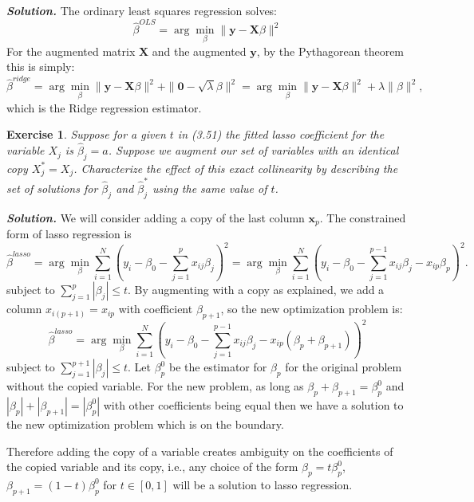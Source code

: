 \documentclass[12pt]{article}
\def\bx{\textbf{x}}
\def\bX{\textbf{X}}
\def\by{\textbf{y}}
\newtheorem{exercise}{Exercise}[section]
\newenvironment{solution}[1][\it{Solution}]{\textbf{#1. } }{\vspace{.5cm}}
\begin{document}
\begin{solution}
    The ordinary least squares regression solves:
    $$\hat{\beta}^{OLS} = \arg\min_{\beta} \|\by - \bX \beta\|^2$$
    For the augmented matrix $\bX$ and the augmented $\by$, by the Pythagorean theorem this is simply:
    $$\hat{\beta}^{ridge} = \arg\min_{\beta} \|\by - \bX \beta\|^2 + \|\mathbf{0} -\sqrt{\lambda} \beta\|^2 = \arg\min_{\beta} \|\by - \bX \beta\|^2 + \lambda \|\beta\|^2,$$
    which is the Ridge regression estimator.

\end{solution}

\begin{exercise}
    Suppose for a given $t$ in (3.51) the fitted lasso coefficient for the variable $X_j$ is $\hat{\beta}_j = a$. Suppose we augment our set of variables with an identical copy $X^*_j = X_j$. Characterize the effect of this exact collinearity by describing the set of solutions for $\hat{\beta}_j$ and $\hat{\beta}_j^*$ using the same value of $t$.
\end{exercise}
\begin{solution}
    We will consider adding a copy of the last column $\bx_p$. The constrained form of lasso regression is 
    $$\hat{\beta}^{lasso} = \arg \min_\beta \sum_{i = 1}^N \left(y_i - \beta_0 - \sum_{j=1}^p x_{ij}\beta_j\right)^2 = \arg \min_\beta \sum_{i = 1}^N \left(y_i - \beta_0 - \sum_{j=1}^{p-1} x_{ij}\beta_j - x_{ip}\beta_p\right)^2.$$
    subject to $\sum_{j = 1}^p |\beta_j| \leq t$.
    By augmenting with a copy as explained, we add a column $x_{i (p+1)} = x_{ip}$ with coefficient $\beta_{p+1}$, so the new optimization problem is:
    $$\hat{\beta}^{lasso} = \arg \min_\beta \sum_{i = 1}^N \left(y_i - \beta_0 - \sum_{j=1}^{p-1} x_{ij}\beta_j - x_{ip}(\beta_p+\beta_{p+1})\right)^2$$
    subject to $\sum_{j = 1}^{p+1} |\beta_j| \leq t$. Let $\beta_p^0$ be the estimator for $\beta_p$ for the original problem without the copied variable. For the new problem, as long as $\beta_p + \beta_{p+1} = \beta_p^0$ and $|\beta_p| + |\beta_{p+1}| = |\beta_p^0|$ with other coefficients being equal then we have a solution to the new optimization problem which is on the boundary. 

    Therefore adding the copy of a variable creates ambiguity on the coefficients of the copied variable and its copy, i.e., any choice of the form $\beta_p = t\beta_p^0$, $\beta_{p+1} = (1-t)\beta_p^0$ for $t \in [0,1]$ will be a solution to lasso regression. 
\end{solution}
\end{document}
